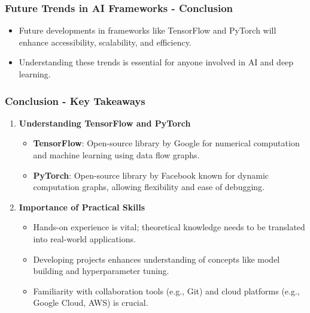 \documentclass[aspectratio=169]{beamer}
\begin{document}
\begin{frame}[fragile]
    \frametitle{Future Trends in AI Frameworks - Conclusion}
    \begin{itemize}
        \item Future developments in frameworks like TensorFlow and PyTorch will enhance accessibility, scalability, and efficiency.
        \item Understanding these trends is essential for anyone involved in AI and deep learning.
    \end{itemize}
\end{frame}

\begin{frame}[fragile]
    \frametitle{Conclusion - Key Takeaways}
    \begin{enumerate}
        \item \textbf{Understanding TensorFlow and PyTorch}
        \begin{itemize}
            \item \textbf{TensorFlow}: Open-source library by Google for numerical computation and machine learning using data flow graphs.
            \item \textbf{PyTorch}: Open-source library by Facebook known for dynamic computation graphs, allowing flexibility and ease of debugging.
        \end{itemize}
        
        \item \textbf{Importance of Practical Skills}
        \begin{itemize}
            \item Hands-on experience is vital; theoretical knowledge needs to be translated into real-world applications.
            \item Developing projects enhances understanding of concepts like model building and hyperparameter tuning.
            \item Familiarity with collaboration tools (e.g., Git) and cloud platforms (e.g., Google Cloud, AWS) is crucial.
        \end{itemize}
    \end{enumerate}
\end{frame}
\end{document}
